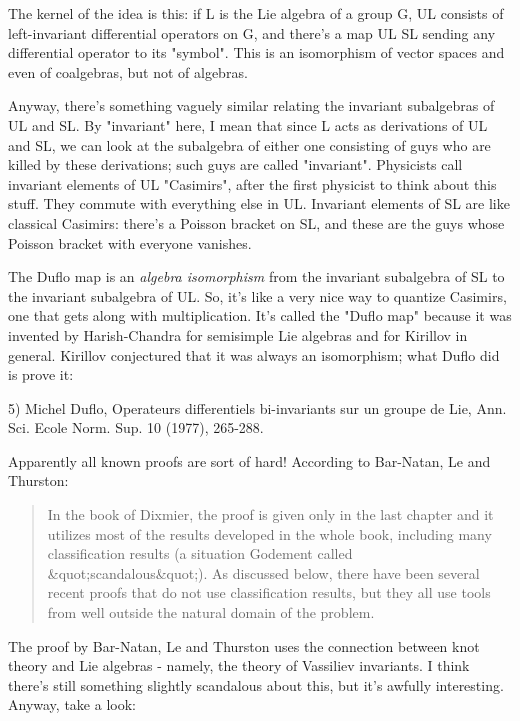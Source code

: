 The kernel of the idea is this: if L is the Lie algebra of a group G, 
UL consists of left-invariant differential operators on G, and there's 
a map UL \to  SL sending any differential operator to its "symbol".  
This is an isomorphism of vector spaces and even of coalgebras, but
not of algebras.  

Anyway, there's something vaguely similar relating the invariant 
subalgebras of UL and SL.  By "invariant" here, I mean that since 
L acts as derivations of UL and SL, we can look at the subalgebra of
either one consisting of guys who are killed by these derivations; 
such guys are called "invariant".   Physicists call invariant 
elements of UL "Casimirs", after the first physicist to think 
about this stuff.  They commute with everything else in 
UL.  Invariant elements of 
SL are like classical Casimirs: there's a Poisson bracket on SL, and
these are the guys whose Poisson bracket with everyone vanishes.

The Duflo map is an \emph{algebra isomorphism} from the invariant
subalgebra of SL to the invariant subalgebra of 
UL.  So, it's
like a very nice way to quantize Casimirs, one that gets along with
multiplication.  It's called the "Duflo map" because it was 
invented by
Harish-Chandra for semisimple Lie algebras and for Kirillov in general.
Kirillov conjectured that it was always an isomorphism; what Duflo
did is prove it: 

5) Michel Duflo, Operateurs differentiels bi-invariants sur un groupe
de Lie, Ann. Sci. Ecole Norm. Sup. 10 (1977), 265-288.

Apparently all known proofs are sort of hard!  According to Bar-Natan,
Le and Thurston:

\begin{quote}
   In the book of Dixmier, the proof is given only in the last chapter
   and it utilizes most of the results developed in the whole book, 
   including many classification results (a situation Godement called
   &quot;scandalous&quot;).  As discussed below, there have been several recent
   proofs that do not use classification results, but they all use tools
   from well outside the natural domain of the problem.
\end{quote}
    
The proof by Bar-Natan, Le and Thurston uses the connection between
knot theory and Lie algebras - namely, the theory of Vassiliev
invariants.  I think there's still something slightly scandalous about 
this, but it's awfully interesting.  Anyway, take a look:

